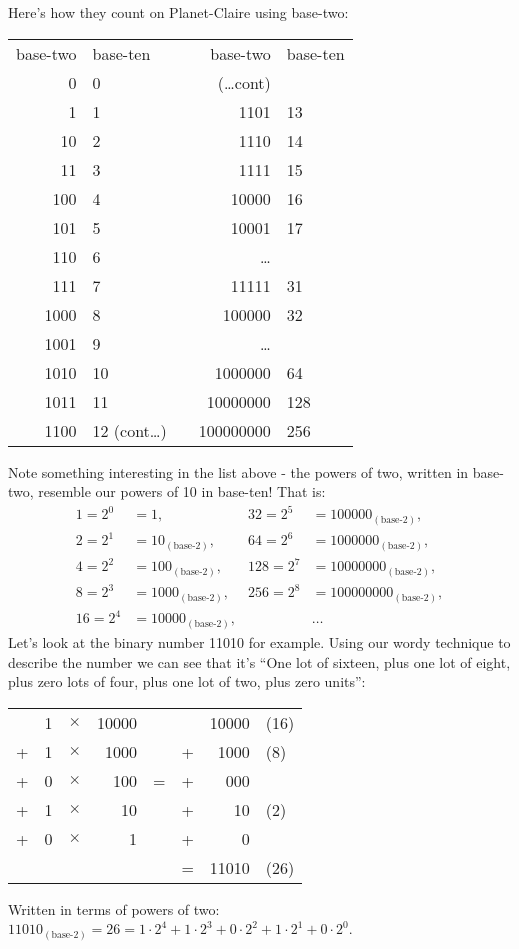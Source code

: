 \documentclass{article}
\begin{document}
\break
Here's how they count on Planet-Claire using base-two:
\begin{center}
\begin{tabular}{r l c r l}
base-two & base-ten & \; \; \; \; & base-two & base-ten\\
0 & 0 & \phantom& (\dots cont)\\
1 & 1 & \phantom& 1101 & 13\\
10 & 2 & \phantom& 1110 & 14\\
11 & 3 & \phantom& 1111 & 15\\
100 & 4 & \phantom& 10000 & 16\\
101 & 5 & \phantom& 10001 & 17\\
110 & 6 & \phantom& \dots{}\\
111 & 7 & \phantom& 11111 & 31\\
1000 & 8 & \phantom& 100000 & 32\\
1001 & 9 & \phantom& \dots{}\\
1010 & 10 & \phantom & 1000000 & 64\\
1011 & 11 & \phantom& 10000000 & 128\\
1100 & 12 (cont\dots) & \phantom& 100000000 & 256
\end{tabular}
\end{center}

Note something interesting in the list above - the powers of two,
written in base-two,
resemble our powers of 10 in base-ten! That is:
\begin{align*}
1 = 2^0&= 1, & 32 = 2^5&= 100000_{(\text{base-2})},\\
2 = 2^1&= 10_{(\text{base-2})}, & 64 = 2^6&= 1000000_{(\text{base-2})},\\
4 = 2^2&= 100_{(\text{base-2})}, & 128 = 2^7&= 10000000_{(\text{base-2})},\\
8 = 2^3&= 1000_{(\text{base-2})},& 256 = 2^8&= 100000000_{(\text{base-2})},\\
16 = 2^4&= 10000_{(\text{base-2})},& & \dots{}
\end{align*}
Let's look at the binary number 11010 for example.
Using our wordy technique to describe the number
we can see that it's ``One lot of sixteen,
plus one lot of eight, plus zero lots of four,
plus one lot of two, plus zero units'': 
\begin{center}
\begin{tabular}{r r r r c r r l}
\phantom & 1 & $\times$ & 10000 & \phantom & \phantom & 10000 & (16)\\
+ & 1 & $\times$ & 1000 & \phantom & + & 1000 & (8)\\
+ & 0 & $\times$ & 100 & \; \; = \; \; & + & 000 & \\
+ & 1 & $\times$ & 10 & \phantom & + & 10 & (2)\\
+ & 0 & $\times$ & 1 & \phantom & + & 0\\
\cline{6-8}
\phantom & \phantom & \phantom & \phantom & \phantom & = & 11010 & (26)\\
\end{tabular}
\end{center}
Written in terms of powers of two:
$11010_{(\text{base-2})}=26=1\cdot2^4+1\cdot2^3+0\cdot2^2+1\cdot2^1+0\cdot2^0$.
\end{document}
